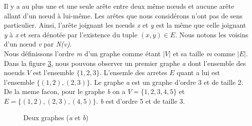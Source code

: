 \documentclass[a4paper, 12pt]{article}
\begin{document}
Il y a au plus une et une seule arête entre deux même nœuds et aucune arête allant d'un nœud à lui-même. Les arêtes que nous considérons n'ont pas de sens particulier. Ainsi, l'arête joignant les nœuds \emph{x} et \emph{y} est la même que celle joignant \emph{y} à \emph{x} et sera dénotée par l'existence du tuple $(x, y) \in E$.
Nous notons les voisins d'un nœud \emph{v} par \emph{N(v)}.\\ 

Nous définissons l'ordre \emph{m} d'un graphe comme étant $ |V| $ et sa taille \emph{m} comme $ |E| $. \\

Dans la figure \ref{fig:x exemple1}, nous pouvons observer un premier graphe \textit{a} dont l'ensemble des noeuds \(V\) est l'ensemble \(\{1, 2, 3\}\). L'ensemle des arretes \(E\) quant a lui est l'ensemble \(\{(1,2), (2,3)\}\). Le graphe \textit{a} est un graphe d'ordre 3 et de taille 2. De la meme facon, pour le graphe \textit{b} on a \(V = \{1, 2, 3, 4, 5\}\) et \(E = \{(1,2), (2,3), (4,5)\}\). \textit{b} est d'ordre 5 et de taille 3. \\

\begin{figure}[h]

  \begin{subfigure}[b]{0.50\textwidth}
    \centering
        \caption{}
        \label{fig:x g1}
  \end{subfigure}
  \begin{subfigure}[b]{0.50\textwidth}
    \centering
        \caption{}
        \label{fig:x g2}
  \end{subfigure}
  \caption{Deux graphes (\textit{a} et \textit{b})}
  \label{fig:x exemple1}
\end{figure}
\end{document}
